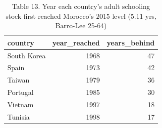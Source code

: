 \begin{table}
\caption{Table 13. Year each country's adult schooling stock first reached Morocco's 2015 level (5.11 yrs, Barro-Lee 25-64)}
\label{tab:T13_years_behind}
\begin{tabular}{lrr}
\toprule
country & year\_reached & years\_behind \\
\midrule
South Korea & 1968 & 47 \\
Spain & 1973 & 42 \\
Taiwan & 1979 & 36 \\
Portugal & 1985 & 30 \\
Vietnam & 1997 & 18 \\
Tunisia & 1998 & 17 \\
\bottomrule
\end{tabular}
\end{table}
